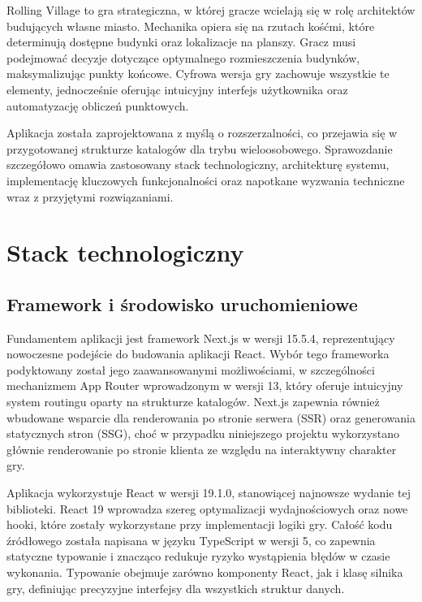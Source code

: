 \documentclass[12pt, a4paper]{article}
\begin{document}
Rolling Village to gra strategiczna, w której gracze wcielają się w rolę architektów budujących własne miasto. Mechanika opiera się na rzutach kośćmi, które determinują dostępne budynki oraz lokalizacje na planszy. Gracz musi podejmować decyzje dotyczące optymalnego rozmieszczenia budynków, maksymalizując punkty końcowe. Cyfrowa wersja gry zachowuje wszystkie te elementy, jednocześnie oferując intuicyjny interfejs użytkownika oraz automatyzację obliczeń punktowych.

Aplikacja została zaprojektowana z myślą o rozszerzalności, co przejawia się w przygotowanej strukturze katalogów dla trybu wieloosobowego. Sprawozdanie szczegółowo omawia zastosowany stack technologiczny, architekturę systemu, implementację kluczowych funkcjonalności oraz napotkane wyzwania techniczne wraz z przyjętymi rozwiązaniami.

\section{Stack technologiczny}

\subsection{Framework i środowisko uruchomieniowe}

Fundamentem aplikacji jest framework Next.js w wersji 15.5.4, reprezentujący nowoczesne podejście do budowania aplikacji React. Wybór tego frameworka podyktowany został jego zaawansowanymi możliwościami, w szczególności mechanizmem App Router wprowadzonym w wersji 13, który oferuje intuicyjny system routingu oparty na strukturze katalogów. Next.js zapewnia również wbudowane wsparcie dla renderowania po stronie serwera (SSR) oraz generowania statycznych stron (SSG), choć w przypadku niniejszego projektu wykorzystano głównie renderowanie po stronie klienta ze względu na interaktywny charakter gry.

Aplikacja wykorzystuje React w wersji 19.1.0, stanowiącej najnowsze wydanie tej biblioteki. React 19 wprowadza szereg optymalizacji wydajnościowych oraz nowe hooki, które zostały wykorzystane przy implementacji logiki gry. Całość kodu źródłowego została napisana w języku TypeScript w wersji 5, co zapewnia statyczne typowanie i znacząco redukuje ryzyko wystąpienia błędów w czasie wykonania. Typowanie obejmuje zarówno komponenty React, jak i klasę silnika gry, definiując precyzyjne interfejsy dla wszystkich struktur danych.
\end{document}
